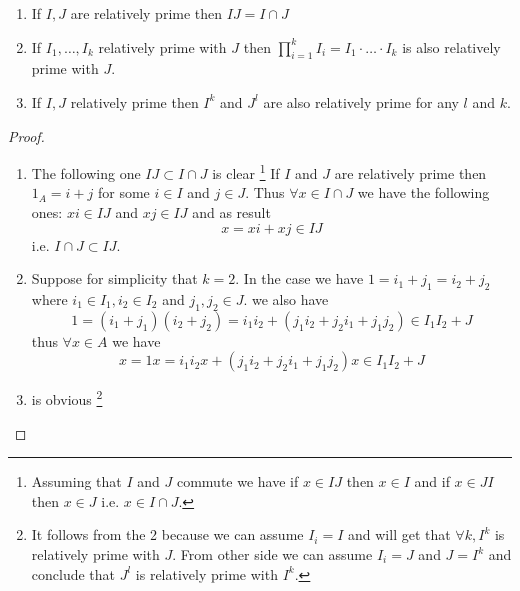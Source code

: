 \begin{lemma}
  \begin{enumerate}
  \item If $I,J$ are relatively prime then $IJ = I \cap J$
  \item If $I_1, \dots, I_k$ relatively prime with $J$ then
    $\prod_{i =1}^k I_i = I_1 \cdot \dots \cdot I_k$ is also
    relatively prime with $J$.
  \item If $I, J$ relatively prime then $I^k$ and $J^l$ are also
    relatively prime for any $l$ and $k$.
  \end{enumerate}
  \begin{proof}
    \begin{enumerate}
    \item
      The following one  $IJ \subset I \cap J$ is clear
      \footnote {
        Assuming that $I$ and $J$ commute we have if
        $x \in IJ$ then $x \in I$ and if
        $x \in JI$ then $x \in J$ i.e. $x \in I \cap J$.
      }
      If $I$ and $J$ are relatively prime then $1_A = i + j$ for some
      $i \in I$ and $j \in J$. Thus $\forall x \in I \cap J$ we have the
      following ones:
      $x i \in IJ$ and $x j \in IJ$ and as result
      \[
      x = x i + x j \in IJ
      \]
      i.e. $I \cap J \subset IJ$.
    \item Suppose for simplicity that $k = 2$. In the case we have
      $1 = i_1 + j_1 = i_2 + j_2$ where $i_1 \in I_1, i_2 \in I_2$ and
      $j_1, j_2 \in J$.
      we also have
      \[
      1 = \left(i_1 + j_1\right) \left(i_2 + j_2\right) =
      i_1 i_2 + \left(j_1 i_2 + j_2 i_1 + j_1 j_2\right)
      \in I_1 I_2 + J
      \]
      thus $\forall x \in A$ we have
      \[
      x = 1 x =
      i_1 i_2 x + \left(j_1 i_2 + j_2 i_1 + j_1 j_2\right) x
      \in I_1 I_2 + J
      \]
    \item is obvious
      \footnote{
        It follows from the 2 because we can assume $I_i = I$ and will
        get that $\forall k, I^k$ is relatively prime with $J$. From
        other side we can assume $I_i = J$ and $J = I^k$ and conclude
        that $J^l$ is relatively prime with $I^k$. 
      }
    \end{enumerate}
  \end{proof}
  \label{lem:aboutrelprimeideals}
\end{lemma}

